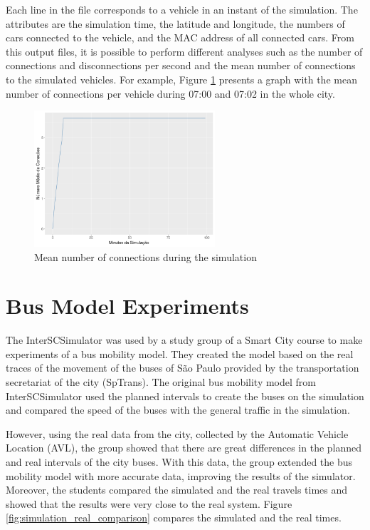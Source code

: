 Each line in the file corresponds to a vehicle in an instant of the simulation. The attributes are the simulation time, the latitude and longitude, the numbers of cars connected to the vehicle, and the MAC address of all connected cars. From this output files, it is possible to perform different analyses such as the number of connections and disconnections per second and the mean number of connections to the simulated vehicles. For example, Figure \ref{fig:media_conexoes} presents a graph with the mean number of connections per vehicle during 07:00 and 07:02 in the whole city. 

\begin{figure}[!htb]
\centering
\includegraphics[width=0.6\textwidth]{figuras/chap-uses/num_conexoes.png}
\caption{Mean number of connections during the simulation}
\label{fig:media_conexoes}
\end{figure}

\section{Bus Model Experiments}
\label{sec:mobiity_model}

The InterSCSimulator was used by a study group of a Smart City course to make experiments of a bus mobility model. They created the model based on the real traces of the movement of the buses of S\~ao Paulo provided by the transportation secretariat of the city (SpTrans). The original bus mobility model from InterSCSimulator used the planned intervals to create the buses on the simulation and compared the speed of the buses with the general traffic in the simulation.

However, using the real data from the city, collected by the Automatic Vehicle Location (AVL), the group showed that there are great differences in the planned and real intervals of the city buses. With this data, the group extended the bus mobility model with more accurate data, improving the results of the simulator. Moreover, the students compared the simulated and the real travels times and showed that the results were very close to the real system. Figure \ref{fig:simulation_real_comparison} compares the simulated and the real times.

